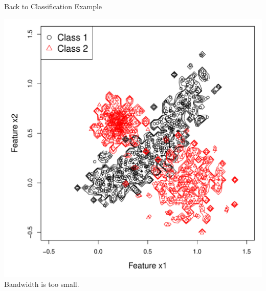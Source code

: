 \documentclass[12pt]{beamer}
\begin{document}
\begin{frame}{Back to Classification Example}

  \begin{center}
    \includegraphics[scale=0.4]{figs/kde2d1.pdf}\\
    Bandwidth is too small.
  \end{center}
  
\end{frame}
\end{document}
